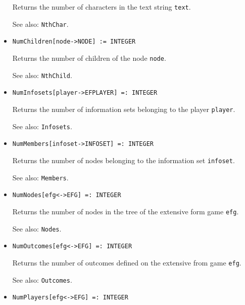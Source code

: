\begin{itemize}
\bd
Returns the number of characters in the text string
\verb+text+.
\item
[See also:] {\tt NthChar}.
\ed

\item
\protect \large \begin{verbatim}
NumChildren[node->NODE] := INTEGER
\end{verbatim}\normalsize

\bd
Returns the number of children of the node \verb+node+.
\item
[See also:] {\tt NthChild}.
\ed

\item
\protect \large \begin{verbatim}
NumInfosets[player->EFPLAYER] =: INTEGER
\end{verbatim}\normalsize

\bd
Returns the number of information sets belonging to the
player \verb+player+.
\item
[See also:] {\tt Infosets}.
\ed

\item
\protect \large \begin{verbatim}
NumMembers[infoset->INFOSET] =: INTEGER
\end{verbatim}\normalsize

\bd
Returns the number of nodes belonging to the information
set \verb+infoset+.
\item
[See also:] {\tt Members}.
\ed

\item
\protect \large \begin{verbatim}
NumNodes[efg<->EFG] =: INTEGER
\end{verbatim}\normalsize

\bd
Returns the number of nodes in the tree of the extensive form
game \verb+efg+.
\item
[See also:] {\tt Nodes}.
\ed

\item
\protect \large \begin{verbatim}
NumOutcomes[efg<->EFG] =: INTEGER
\end{verbatim} \normalsize

\bd
Returns the number of outcomes defined on the extensive from
game \verb+efg+.
\item
[See also:] {\tt Outcomes}.
\ed

\item
\protect \large \begin{verbatim}
NumPlayers[efg<->EFG] =: INTEGER
\end{verbatim} \normalsize


\end{itemize}
